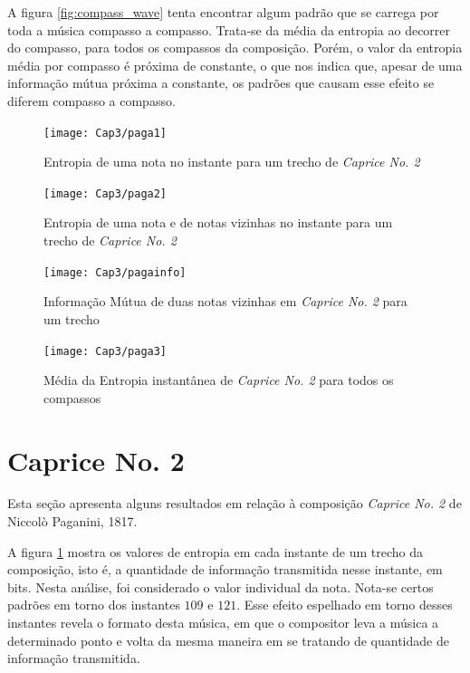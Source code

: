 A figura \ref{fig:compass_wave} tenta encontrar algum padrão que se carrega por toda a música compasso a compasso. Trata-se da média da entropia ao decorrer do compasso, para todos os compassos da composição. Porém, o valor da entropia média por compasso é próxima de constante, o que nos indica que, apesar de uma informação mútua próxima a constante, os padrões que causam esse efeito se diferem compasso a compasso.


\begin{figure}[H]
    \centering
    \texttt{[image: Cap3/paga1]}
    \caption{Entropia de uma nota no instante para um trecho de \textit{Caprice No. 2}}
    \label{fig:paga1}
\end{figure}

\begin{figure}[H]
    \centering
    \texttt{[image: Cap3/paga2]}
    \caption{Entropia de uma nota e de notas vizinhas no instante para um trecho de \textit{Caprice No. 2}}
    \label{fig:paga2}
\end{figure}

\begin{figure}[H]
    \centering
    \texttt{[image: Cap3/pagainfo]}
    \caption{Informação Mútua de duas notas vizinhas em \textit{Caprice No. 2} para um trecho}
    \label{fig:pagainfo}
\end{figure}

\begin{figure}[H]
    \centering
    \texttt{[image: Cap3/paga3]}
    \caption{Média da Entropia instantânea de \textit{Caprice No. 2} para todos os compassos}
    \label{fig:paga3}
\end{figure}

\section{Caprice No. 2}

Esta seção apresenta alguns resultados em relação à composição \textit{Caprice No. 2} de Niccolò Paganini, 1817. \cite{caprice2}

A figura \ref{fig:paga1} mostra os valores de entropia em cada instante de um trecho da composição, isto é, a quantidade de informação transmitida nesse instante, em bits. Nesta análise, foi considerado o valor individual da nota. Nota-se certos padrões em torno dos instantes $109$ e $121$. Esse efeito espelhado em torno desses instantes revela o formato desta música, em que o compositor leva a música a determinado ponto e volta da mesma maneira em se tratando de quantidade de informação transmitida.

